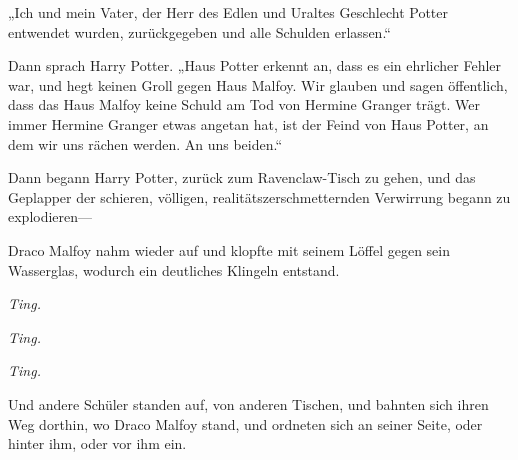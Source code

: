 „Ich und mein Vater, der Herr des Edlen und Uraltes Geschlecht Potter entwendet wurden, zurückgegeben und alle Schulden erlassen.“

Dann sprach Harry Potter.
„Haus Potter erkennt an, dass es ein ehrlicher Fehler war, und hegt keinen Groll gegen Haus Malfoy. Wir glauben und sagen öffentlich, dass das Haus Malfoy keine Schuld am Tod von Hermine Granger trägt. Wer immer Hermine Granger etwas angetan hat, ist der Feind von Haus Potter, an dem wir uns rächen werden. An uns beiden.“

Dann begann Harry Potter, zurück zum Ravenclaw-Tisch zu gehen, und das Geplapper der schieren, völligen, realitätszerschmetternden Verwirrung begann zu explodieren—

Draco Malfoy nahm wieder auf und klopfte mit seinem Löffel gegen sein Wasserglas, wodurch ein deutliches Klingeln entstand.

\emph{Ting.}

\emph{Ting.}

\emph{Ting.}

Und andere Schüler standen auf, von anderen Tischen, und bahnten sich ihren Weg dorthin, wo Draco Malfoy stand, und ordneten sich an seiner Seite, oder hinter ihm, oder vor ihm ein.

